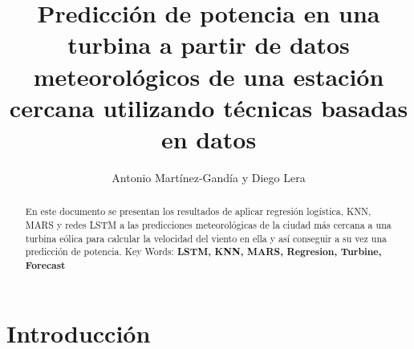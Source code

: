 \documentclass[10pt, a4paper, twocolumn]{article}
\title{Predicción de potencia en una turbina a partir de datos meteorológicos de una estación cercana utilizando técnicas basadas en datos}
\author{Antonio Martínez-Gandía y Diego Lera}
\begin{document}
\maketitle


\begin{abstract}
\begin{flushleft}

En este documento se presentan los resultados de aplicar regresión logística, KNN, MARS y redes LSTM a las predicciones meteorológicas de la ciudad más cercana a una turbina eólica para calcular la velocidad del viento en ella y así conseguir a su vez una predicción de potencia.
Key Words: \textbf{LSTM, KNN, MARS, Regresion, Turbine, Forecast}
\end{flushleft}
\end{abstract}


\section*{Introducción}
\end{document}
